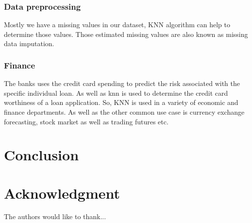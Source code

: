 \documentclass[conference]{IEEEtran}
\begin{document}
\subsubsection{Data preprocessing}
Mostly we have a missing values in our dataset, KNN algorithm can help to determine those values. Those estimated missing values are also known as missing data imputation. 

\subsubsection{Finance}
The banks uses the credit card spending to predict the risk associated with the specific individual loan. As well as knn is used to determine the credit card worthiness of a loan application. So, KNN is used in a variety of economic and finance departments. As well as the other common use case is currency exchange forecasting, stock market as well as trading futures etc.  



\section{Conclusion}




\section*{Acknowledgment}


The authors would like to thank...






\end{document}
